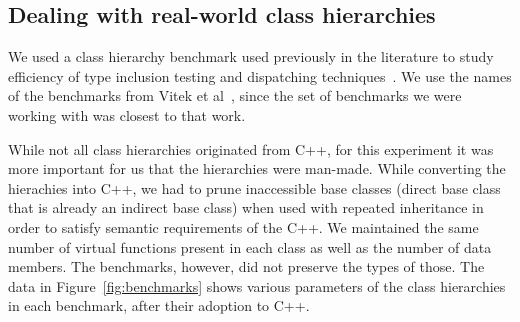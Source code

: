 
\subsection{Dealing with real-world class hierarchies}
\label{sec:hierarchies}

We used a class hierarchy benchmark used previously in the literature to study efficiency of type 
inclusion testing and dispatching techniques~\cite{Vitek97,Krall97nearoptimal,PQEncoding,Ducournau08}. 
We use the names of the benchmarks from Vitek et al~\cite[Table 2]{Vitek97}, 
since the set of benchmarks we were working with was closest to that work.

While not all class hierarchies originated from C++, for this experiment it 
was more important for us that the hierarchies were man-made. While converting 
the hierachies into C++, we had to prune inaccessible base classes (direct base  
class that is already an indirect base class) when used with repeated 
inheritance in order to satisfy semantic requirements of the C++. We maintained 
the same number of virtual functions present in each class as well as the number 
of data members. The benchmarks, however, did not preserve the types of those.
The data in Figure~\ref{fig:benchmarks} shows various parameters of the class 
hierarchies in each benchmark, after their adoption to C++. 

